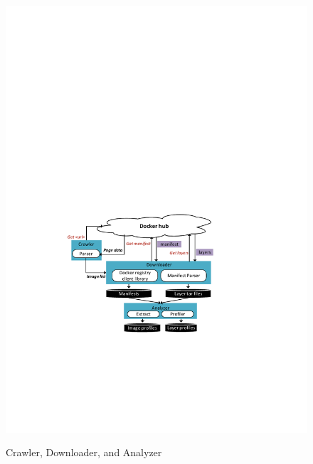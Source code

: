 \begin{figure}
	\centering
	\includegraphics[width=1\textwidth]{graphs/fig-downloader-analyzer}\\
	\caption{Crawler, Downloader, and Analyzer}\label{fig-downloader-analyzer}
\end{figure}

%
